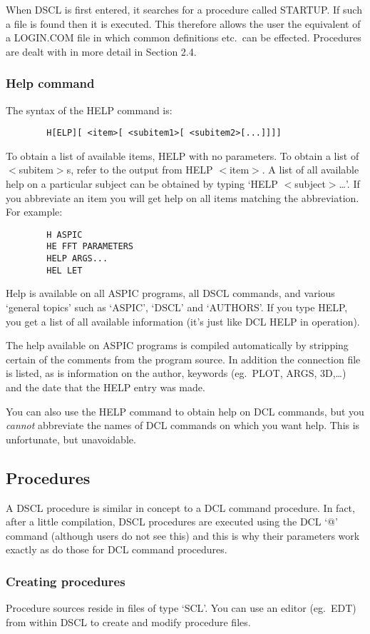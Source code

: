 When DSCL is first entered, it searches for a procedure called STARTUP.
If such a file is found then it is executed.
This therefore allows the user the equivalent of a LOGIN.COM file in which
common definitions etc.\ can be effected.
Procedures are dealt with in more detail in Section 2.4.
\subsubsection {Help command}
The syntax of the HELP command is:
\begin{verbatim}
        H[ELP][ <item>[ <subitem1>[ <subitem2>[...]]]]
\end{verbatim}
To obtain a list of available items, HELP with no parameters.
To obtain a list of $<$subitem$>$s, refer to the output from HELP $<$item$>$.
A list of all available help on a particular subject can be obtained by typing
`HELP $<$subject$>$\ldots'.
If you abbreviate an item you will get help on all items matching the
abbreviation.
For example:
\begin{verbatim}
        H ASPIC
        HE FFT PARAMETERS
        HELP ARGS...
        HEL LET
\end{verbatim}
Help is available on all ASPIC programs, all DSCL commands, and various `general
topics' such as `ASPIC', `DSCL' and `AUTHORS'.
If you type HELP, you get a list of all available information (it's just like
DCL HELP in operation).

The help available on ASPIC programs is compiled automatically by stripping
certain of the comments from the program source.
In addition the connection file is listed, as is information on the author,
keywords (eg.\ PLOT, ARGS, 3D,\ldots) and the date that the HELP entry was made.

You can also use the HELP command to obtain help on DCL commands, but you
{\em cannot} abbreviate the names of DCL commands on which you want help.
This is unfortunate, but unavoidable.
\subsection {Procedures}
A DSCL procedure is similar in concept to a DCL command procedure.
In fact, after a little compilation, DSCL procedures are executed using the DCL
`@' command (although users do not see this) and this is why their parameters
work exactly as do those for DCL command procedures.
\subsubsection {Creating procedures}
Procedure sources reside in files of type `SCL'.
You can use an editor (eg.\ EDT) from within DSCL to create and modify procedure
files.

